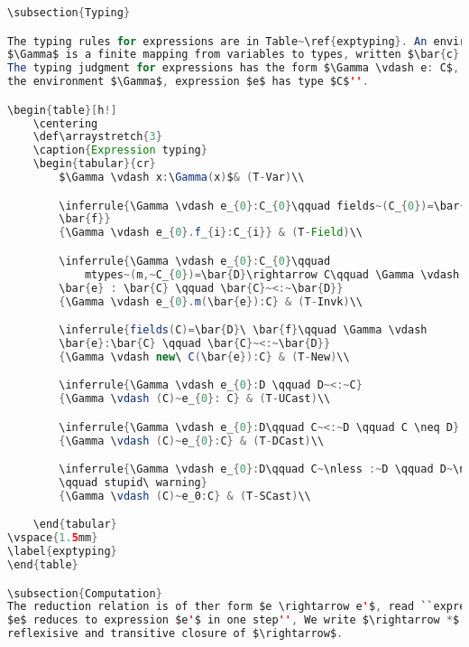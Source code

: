 \begin{lstlisting}[language=Java]
\subsection{Typing}

The typing rules for expressions are in Table~\ref{exptyping}. An environment
$\Gamma$ is a finite mapping from variables to types, written $\bar{c}:\bar{C}$.
The typing judgment for expressions has the form $\Gamma \vdash e: C$, read ``in
the environment $\Gamma$, expression $e$ has type $C$''.

\begin{table}[h!]
	\centering
	\def\arraystretch{3}
    \caption{Expression typing}
	\begin{tabular}{cr}
		$\Gamma \vdash x:\Gamma(x)$& (T-Var)\\

		\inferrule{\Gamma \vdash e_{0}:C_{0}\qquad fields~(C_{0})=\bar{C}\
		\bar{f}}
		{\Gamma \vdash e_{0}.f_{i}:C_{i}} & (T-Field)\\

		\inferrule{\Gamma \vdash e_{0}:C_{0}\qquad
			mtypes~(m,~C_{0})=\bar{D}\rightarrow C\qquad \Gamma \vdash
		\bar{e} : \bar{C} \qquad \bar{C}~<:~\bar{D}}
		{\Gamma \vdash e_{0}.m(\bar{e}):C} & (T-Invk)\\

		\inferrule{fields(C)=\bar{D}\ \bar{f}\qquad \Gamma \vdash
		\bar{e}:\bar{C} \qquad \bar{C}~<:~\bar{D}}
		{\Gamma \vdash new\ C(\bar{e}):C} & (T-New)\\

		\inferrule{\Gamma \vdash e_{0}:D \qquad D~<:~C}
		{\Gamma \vdash (C)~e_{0}: C} & (T-UCast)\\

		\inferrule{\Gamma \vdash e_{0}:D\qquad C~<:~D \qquad C \neq D}
		{\Gamma \vdash (C)~e_{0}:C} & (T-DCast)\\

		\inferrule{\Gamma \vdash e_{0}:D\qquad C~\nless :~D \qquad D~\nless:~C 
		\qquad stupid\ warning}
		{\Gamma \vdash (C)~e_0:C} & (T-SCast)\\

	\end{tabular}
\vspace{1.5mm}
\label{exptyping}
\end{table}

\subsection{Computation}
The reduction relation is of ther form $e \rightarrow e'$, read ``expression
$e$ reduces to expression $e'$ in one step'', We write $\rightarrow *$ for the
reflexisive and transitive closure of $\rightarrow$.


\end{lstlisting}
